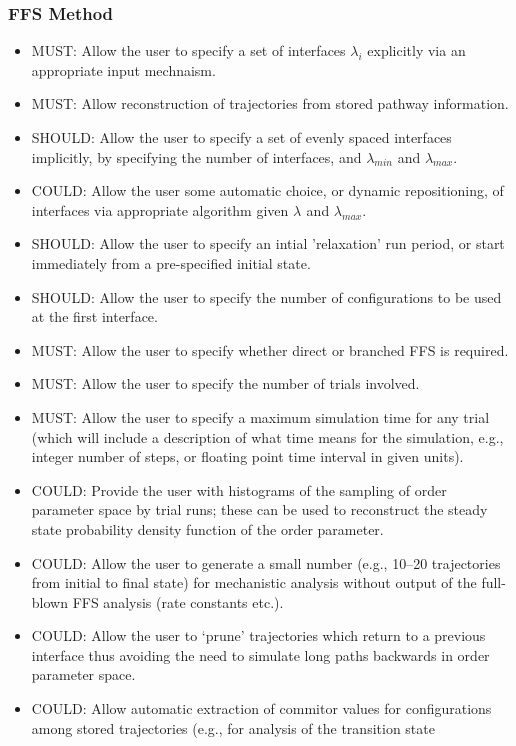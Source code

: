 \documentclass[11pt]{article}
\begin{document}
\subsubsection{FFS Method}
\begin{itemize}
\item
MUST: Allow the user to specify a set of interfaces $\lambda_i$ explicitly
via an appropriate input mechnaism.
\item
MUST: Allow reconstruction of trajectories from stored pathway information.
\item
SHOULD: Allow the user to specify a set of evenly spaced interfaces
implicitly, by specifying the number of interfaces, and $\lambda_{min}$
and $\lambda_{max}$.
\item
COULD: Allow the user some automatic choice, or dynamic repositioning, of
interfaces via appropriate algorithm given $\lambda_{}$ and $\lambda_{max}$.
\item
SHOULD: Allow the user to specify an intial 'relaxation' run period, or
start immediately from a pre-specified initial state.
\item
SHOULD: Allow the user to specify the number of configurations to be used
at the first interface.
\item
MUST: Allow the user to specify whether direct or branched FFS is required.
\item
MUST: Allow the user to specify the number of trials involved.
\item
MUST: Allow the user to specify a maximum simulation time for any trial
(which will include a description of what time means for the simulation,
e.g., integer number of steps, or floating point time interval in given
units).
\item
COULD: Provide the user with histograms of the sampling of order parameter
space by trial runs; these can be used to reconstruct the steady state
probability density function of the order parameter. %
\item
COULD: Allow the user to generate a small number (e.g., 10--20 trajectories
from initial to final state) for mechanistic analysis without output of the
full-blown FFS analysis (rate constants etc.).
\item
COULD: Allow the user to `prune' trajectories which return to a previous
interface thus avoiding the need to simulate long paths backwards in
order parameter space. %
\item
COULD: Allow automatic extraction of commitor values for configurations
among stored trajectories (e.g., for analysis of the transition state

\end{itemize}
\end{document}
